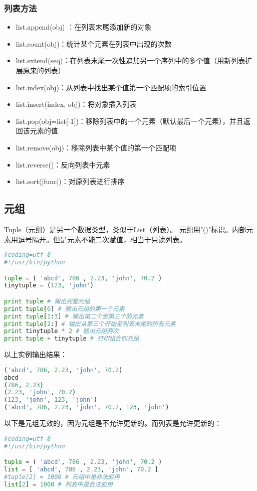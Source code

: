 \subsubsection{列表方法}
\begin{itemize}
\item list.append(obj) ：在列表末尾添加新的对象

\item list.count(obj)：统计某个元素在列表中出现的次数

\item list.extend(seq)：在列表末尾一次性追加另一个序列中的多个值（用新列表扩展原来的列表）

\item list.index(obj)：从列表中找出某个值第一个匹配项的索引位置

\item list.insert(index, obj)：将对象插入列表

\item list.pop(obj=list[-1])：移除列表中的一个元素（默认最后一个元素），并且返回该元素的值

\item list.remove(obj)：移除列表中某个值的第一个匹配项

\item list.reverse()：反向列表中元素

\item list.sort([func])：对原列表进行排序
\end{itemize}







\subsection{元组}
Tuple（元组）是另一个数据类型，类似于List（列表）。
元组用"()"标识。内部元素用逗号隔开。但是元素不能二次赋值，相当于只读列表。
\begin{lstlisting}[language=Python]
#coding=utf-8
#!/usr/bin/python

tuple = ( 'abcd', 786 , 2.23, 'john', 70.2 )
tinytuple = (123, 'john')

print tuple # 输出完整元组
print tuple[0] # 输出元组的第一个元素
print tuple[1:3] # 输出第二个至第三个的元素 
print tuple[2:] # 输出从第三个开始至列表末尾的所有元素
print tinytuple * 2 # 输出元组两次
print tuple + tinytuple # 打印组合的元组
\end{lstlisting}
以上实例输出结果：
\begin{lstlisting}[language=Python]
('abcd', 786, 2.23, 'john', 70.2)
abcd
(786, 2.23)
(2.23, 'john', 70.2)
(123, 'john', 123, 'john')
('abcd', 786, 2.23, 'john', 70.2, 123, 'john')
\end{lstlisting}
以下是元组无效的，因为元组是不允许更新的。而列表是允许更新的：
\begin{lstlisting}[language=Python]
#coding=utf-8
#!/usr/bin/python

tuple = ( 'abcd', 786 , 2.23, 'john', 70.2 )
list = [ 'abcd', 786 , 2.23, 'john', 70.2 ]
#tuple[2] = 1000 # 元组中是非法应用
list[2] = 1000 # 列表中是合法应用
\end{lstlisting}


